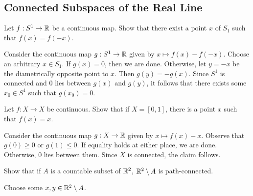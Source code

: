 
\subsection{Connected Subspaces of the Real Line}

	\setcounter{exercise}{1}
	\begin{exercise}
		Let $f:S^1\to\mathbb{R}$ be a continuous map. Show that there exist a point $x$ of $S_1$ such that $f(x)=f(-x)$.
	\end{exercise}
	\begin{solution*}
		Consider the continuous map $g:S^1\to\mathbb{R}$ given by $x\mapsto f(x)-f(-x)$. Choose an arbitrary $x\in S_1$. If $g(x)=0$, then we are done. Otherwise, let $y=-x$ be the diametrically opposite point to $x$. Then $g(y)=-g(x)$. Since $S^1$ is connected and $0$ lies between $g(x)$ and $g(y)$, it follows that there exists some $x_0\in S^1$ such that $g(x_0)=0$.
	\end{solution*}

	\begin{exercise}
		Let $f:X\to X$ be continuous. Show that if $X=[0,1]$, there is a point $x$ such that $f(x)=x$.
	\end{exercise}
	\begin{solution*}
		Consider the continuous map $g:X\to\mathbb{R}$ given by $x\mapsto f(x)-x$. Observe that $g(0)\geq 0$ or $g(1)\leq 0$. If equality holds at either place, we are done. Otherwise, $0$ lies between them. Since $X$ is connected, the claim follows.
	\end{solution*}

	\begin{exercise}
		Show that if $A$ is a countable subset of $\mathbb{R}^2$, $\mathbb{R}^2\setminus A$ is path-connected.
	\end{exercise}
	\begin{solution*}
		Choose some $x,y\in\mathbb{R}^2\setminus A$.
	\end{solution*}